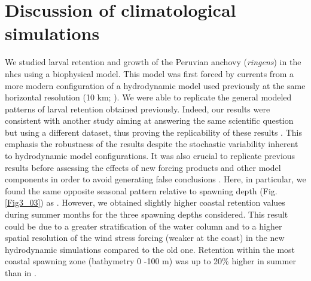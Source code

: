 \section{Discussion of climatological simulations}\label{Chap3Disc1}

We studied larval retention and growth of the Peruvian anchovy (\textit{\gls{ringens}}) in the \acrshort{nhcs} using a biophysical model. This model was first forced by currents from a more modern configuration of a hydrodynamic model used previously at the same horizontal resolution (10 km; \cite{BrocLett2008}). We were able to replicate the general modeled patterns of larval retention obtained previously. Indeed, our results were consistent with another study aiming at answering the same scientific question but using a different dataset, thus proving the replicability of these results \citep{NAP25303}. This emphasis the robustness of the results despite the stochastic variability inherent to hydrodynamic model configurations. It was also crucial to replicate previous results before assessing the effects of new forcing products and other model components in order to avoid generating false conclusions \citep{Bake2016}. Here, in particular, we found the same opposite seasonal pattern relative to spawning depth (Fig. \ref{Fig3_03}) as \cite{BrocLett2008}. However, we obtained slightly higher coastal retention values during summer months for the three spawning depths considered. This result could be due to a greater stratification of the water column and to a higher spatial resolution of the wind stress forcing (weaker at the coast) in the new hydrodynamic simulations compared to the old one. Retention within the most coastal spawning zone (bathymetry 0 -100 m) was up to 20\% higher in summer than in \cite{BrocLett2008}.\\

